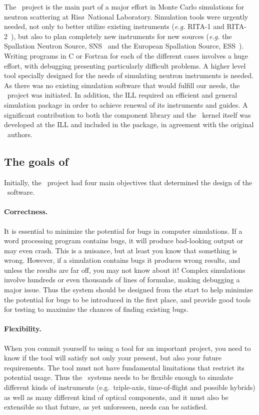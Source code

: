 The \MCS\ project is the main part of a major effort in Monte Carlo simulations
for neutron scattering at Ris\o\ National Laboratory. Simulation tools were urgently needed,
not only to better utilize existing instruments
({\em e.g.} RITA-1 and RITA-2~\cite{cjp_73_697,pb_241_50,pb_283_343}), 
but also to plan completely new instruments for new sources 
({\em e.g.} the Spallation Neutron Source, SNS~\cite{sns_webpage} 
and the European Spallation Source, ESS~\cite{ess_webpage}). 
Writing programs in C or Fortran for
each of the different cases involves a huge effort, with debugging presenting
particularly difficult problems. A higher level tool specially designed
for the needs of simulating neutron instruments is needed. As there was
no existing simulation software that would fulfill our needs, the \MCS\ 
project was initiated.
In addition, the ILL required an efficient and general simulation
package in order to achieve renewal of its instruments and guides. 
A significant contribution to both the component library and the \MCS\ 
kernel itself was developed at the ILL and included in the package, in 
agreement with the original \MCS\ authors.

\subsection{The goals of \MCS}
\label{s:goals}

Initially, the \MCS\ project had four main objectives that determined the design
of the \MCS\ software.

\paragraph{Correctness.}
It is essential to minimize the potential for bugs in computer
simulations.  If a word processing program contains bugs, it will
produce bad-looking output or may even crash. This is a nuisance, but at
least you know that something is wrong. However, if a simulation
contains bugs it produces wrong results, and unless the results are far
off, you may not know about it! Complex simulations involve hundreds or
even thousands of lines of formulae, making debugging a major issue. Thus the
system should be designed from the start to help minimize the potential
for bugs to be introduced in the first place, and provide good tools for
testing to maximize the chances of finding existing bugs.
%
\paragraph{Flexibility.}
When you commit yourself to using a tool for an important project, you
need to know if the tool will satisfy not only your present, but also
your future requirements. The tool must not have fundamental limitations that
restrict its potential usage. Thus the \MCS\ systems needs to be
flexible enough to simulate different kinds of instruments (e.g.\ triple-axis,
time-of-flight and possible hybrids) as well as many different kind of
optical components, and it must also be extensible so that future, as
yet unforeseen, needs can be satisfied.
%
